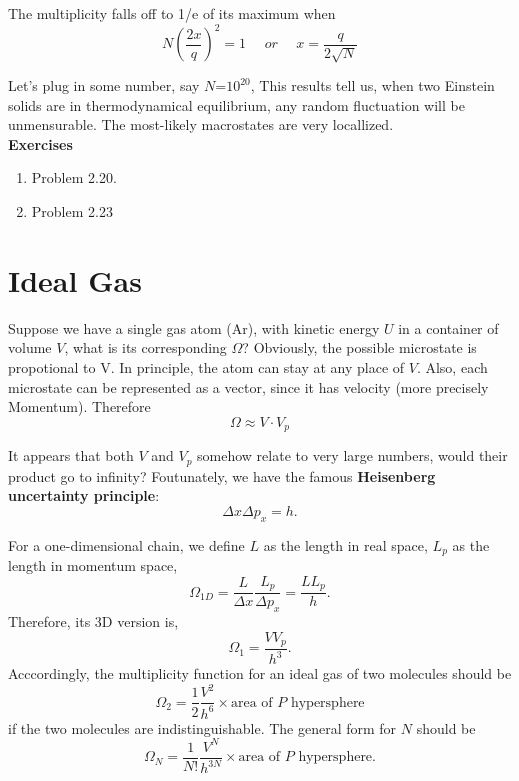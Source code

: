\documentclass[twoside]{article}
\begin{document}
The multiplicity falls off to 1/e of its maximum when 
\begin{equation}
  N(\frac{2x}{q})^2 = 1 ~~~~~~or~~~~~~ x = \frac{q}{2\sqrt{N}}
\end{equation}

Let's plug in some number, say $N$=\textrm {$10^{20}$}, 
This results tell us,
when two Einstein solids are in thermodynamical equilibrium, any random fluctuation
will be unmensurable. The most-likely macrostates are very locallized.\\
{\bf Exercises}
\begin{enumerate}
\item Problem 2.20. 
\item Problem 2.23
\end{enumerate}

\section{Ideal Gas}
Suppose we have a single gas atom (Ar), with kinetic energy $U$ in a container of volume $V$, what is its corresponding $\Omega$?
Obviously, the possible microstate is propotional to V. In principle, the atom can stay at any place of $V$.
Also, each microstate can be represented as a vector, since it has velocity (more precisely Momentum). 
Therefore
\begin{equation}
\Omega \approx V\cdot V_p
\end{equation}



It appears that both $V$ and $V_p$ somehow relate to very large numbers, would their product go to infinity? 
Foutunately, we have the famous {\bf Heisenberg uncertainty principle}:
\begin{equation} \Delta{x}\Delta{p_x} = h. \end{equation}

For a one-dimensional chain, we define $L$ as the length in real space, $L_p$ as the length in momentum space,
\begin{equation} \Omega_{1D} = \frac{L}{\Delta{x}} \frac{L_p}{\Delta{p_x}} = \frac{LL_p}{h}. \end{equation}
Therefore, its 3D version is,
\begin{equation} \Omega_1 = \frac{VV_p}{h^3}. \end{equation}
Acccordingly, the multiplicity function for an ideal gas of two molecules should be
\begin{equation} 
\Omega_2 = \frac{1}{2}\frac{V^2}{h^6} \times \text{area of $P$ hypersphere}
\end{equation}
if the two molecules are indistinguishable.
The general form for $N$ should be 
\begin{equation} \Omega_N = \frac{1}{N!}\frac{V^N}{h^{3N}} \times \text{area of $P$ hypersphere}. \end{equation}
\end{document}
